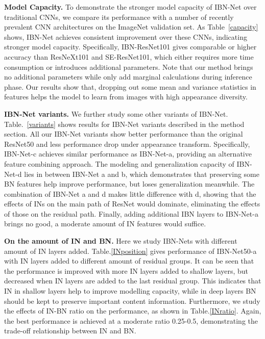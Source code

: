 \documentclass[runningheads]{llncs}
\begin{document}
\textbf{Model Capacity.}
To demonstrate the stronger model capacity of IBN-Net over traditional CNNs, we compare its performance with a number of recently prevalent CNN architectures on the ImageNet validation set.
As Table~\ref{capacity} shows, IBN-Net achieves consistent improvement over these CNNs, indicating stronger model capacity.
Specifically, IBN-ResNet101 gives comparable or higher accuracy than ResNeXt101 and SE-ResNet101, which either requires more time consumption or introduces additional parameters.
Note that our method brings no additional parameters while only add marginal calculations during inference phase.
Our results show that, dropping out some mean and variance statistics in features helps the model to learn from images with high appearance diversity.

\textbf{IBN-Net variants.}
We further study some other variants of IBN-Net.
Table.~\ref{variants} shows results for IBN-Net variants described in the method section.
All our IBN-Net variants show better performance than the original ResNet50 and less performance drop under appearance transform.
Specifically, IBN-Net-c achieves similar performance as IBN-Net-a, providing an alternative feature combining approach.
The modeling and generalization capacity of IBN-Net-d lies in between IBN-Net a and b, which demonstrates that preserving some BN features help improve performance, but loses generalization meanwhile.
The combination of IBN-Net a and d makes little difference with d, showing that the effects of INs on the main path of ResNet would dominate, eliminating the effects of those on the residual path.
Finally, adding additional IBN layers to IBN-Net-a brings no good, a moderate amount of IN features would suffice.

\textbf{On the amount of IN and BN.}
Here we study IBN-Nets with different amount of IN layers added.
Table.\ref{INposition} gives performance of IBN-Net50-a with IN layers added to different amount of residual groups.
It can be seen that the performance is improved with more IN layers added to shallow layers, but decreased when IN layers are added to the last residual group. This indicates that IN in shallow layers help to improve modelling capacity, while in deep layers BN should be kept to preserve important content information.
Furthermore, we study the effects of IN-BN ratio on the performance, as shown in Table.\ref{INratio}.
Again, the best performance is achieved at a moderate ratio 0.25-0.5, demonstrating the trade-off relationship between IN and BN.
\end{document}
